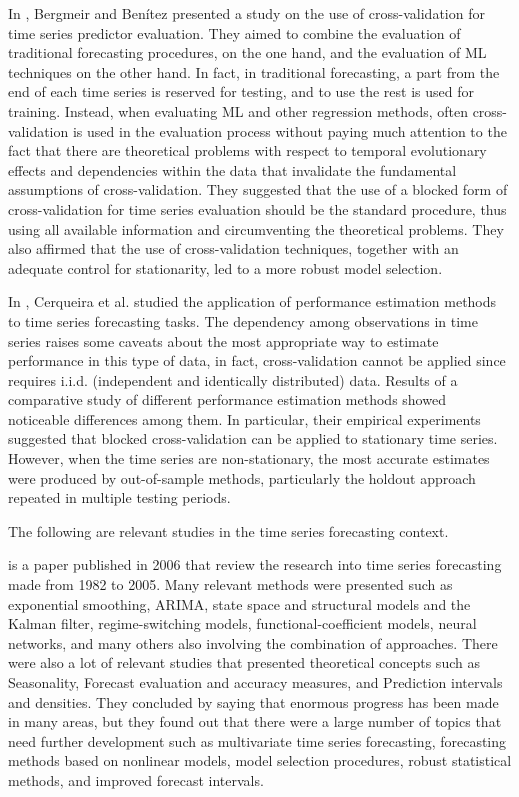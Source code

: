In \cite{BERGMEIR2012192}, Bergmeir and Benítez presented a study on the use of cross-validation for time series predictor evaluation.
They aimed to combine the evaluation of traditional forecasting procedures, on the one hand, and the evaluation of ML techniques on the other hand.
In fact, in traditional forecasting, a part from the end of each time series is reserved for testing, and to use the rest is used for training.
Instead, when evaluating ML and other regression methods, often cross-validation is used in the evaluation process without paying much attention to the fact that there are theoretical problems with respect to temporal evolutionary effects and dependencies within the data that invalidate the fundamental assumptions of cross-validation.
They suggested that the use of a blocked form of cross-validation for time series evaluation should be the standard procedure, thus using all available information and circumventing the theoretical problems.
They also affirmed that the use of cross-validation techniques, together with an adequate control for stationarity, led to a more robust model selection.

In \cite{Cerqueira2020}, Cerqueira et al. studied the application of performance estimation methods to time series forecasting tasks.
The dependency among observations in time series raises some caveats about the most appropriate way to estimate performance in this type of data, in fact, cross-validation cannot be applied since requires i.i.d. (independent and identically distributed) data.
Results of a comparative study of different performance estimation methods showed noticeable differences among them.
In particular, their empirical experiments suggested that blocked cross-validation can be applied to stationary time series.
However, when the time series are non-stationary, the most accurate estimates were produced by out-of-sample methods, particularly the holdout approach repeated in multiple testing periods.

The following are relevant studies in the time series forecasting context.

\cite{DEGOOIJER2006443} is a paper published in 2006 that review the research into time series forecasting made from 1982 to 2005.
Many relevant methods were presented such as exponential smoothing, ARIMA, state space and structural models and the Kalman filter, regime-switching models, functional-coefficient models, neural networks, and many others also involving the combination of approaches.
There were also a lot of relevant studies that presented theoretical concepts such as Seasonality, Forecast evaluation and accuracy measures, and Prediction intervals and densities.
They concluded by saying that enormous progress has been made in many areas, but they found out that there were a large number of topics that need further development such as multivariate time series forecasting, forecasting methods based on nonlinear models, model selection procedures, robust statistical methods, and improved forecast intervals.

